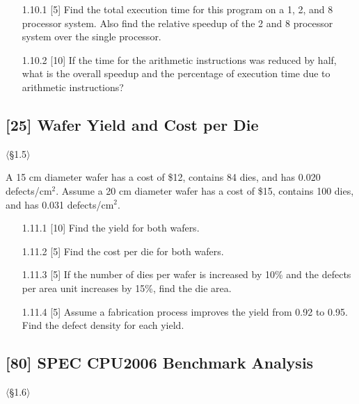 \begin{enumerate}
  \item[1.10.1] [5] Find the total execution time for this program on a 1, 2, and
        8 processor system. Also find the relative speedup of the 2 and 8
        processor system over the single processor.
  \item[1.10.2] [10] If the time for the arithmetic instructions was reduced by
        half, what is the overall speedup and the percentage of execution time
        due to arithmetic instructions?
\end{enumerate}

\problembreak %

\subsection{[25] Wafer Yield and Cost per Die}
\hypertarget{prob-1.11}{}
\noindent$\langle$\S1.5$\rangle$\medskip

\noindent A 15 cm diameter wafer has a cost of \$12, contains 84 dies, and has 0.020
defects/cm$^2$. Assume a 20 cm diameter wafer has a cost of \$15, contains
100 dies, and has 0.031 defects/cm$^2$.

\begin{enumerate}
  \item[1.11.1] [10] Find the yield for both wafers.
  \item[1.11.2] [5] Find the cost per die for both wafers.
  \item[1.11.3] [5] If the number of dies per wafer is increased by 10\% and the
        defects per area unit increases by 15\%, find the die area.
  \item[1.11.4] [5] Assume a fabrication process improves the yield from 0.92 to
        0.95. Find the defect density for each yield.
\end{enumerate}

\problembreak %

\subsection{[80] SPEC CPU2006 Benchmark Analysis}
\hypertarget{prob-1.12}{}
\noindent$\langle$\S1.6$\rangle$\medskip

